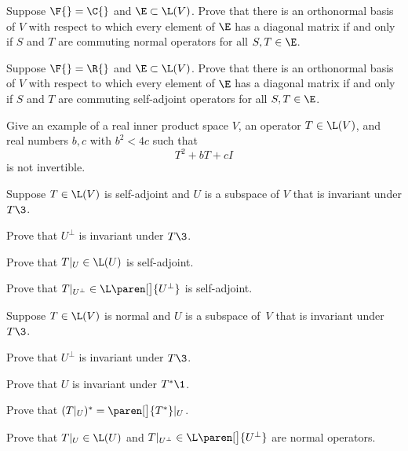 \exercise
Suppose $\F{} = \C{}$ and $\E \subset \L(V)$. Prove that there is an orthonormal basis of $V$ with respect to which every element of $\E$ has a diagonal matrix if and only if $S$ and $T$ are commuting normal operators for all $S, T \in \E$.%
 \label{5SimDiag}


\exercise
Suppose $\F{} = \R{}$ and $\E \subset \L(V)$. Prove that there is an orthonormal basis of $V$ with respect to which every element of $\E$ has a diagonal matrix if and only if $S$ and $T$ are commuting self-adjoint operators for all $S, T \in \E$.%
 \label{5SimDiagR}


\exercise
Give an example of a real inner product space $V$, an operator $T \in \L(V)$, and real numbers $b, c$ with $b^2 < 4 c$ such that
\[
T^2 + b T + c I
\]
is not invertible.


\exercise
Suppose $T \in \L(V)$ is self-adjoint and $U$ is a subspace of $V$ that is invariant under $T\3$.\label{sa210}
\begin{subtheorem}
\item
Prove that $U^\perp$ is invariant under\/ $T\3$.
\item
Prove that $T|_U \in \L(U)$ is self-adjoint.
\item
Prove that $T|_{U^\perp} \in \L\paren[\big]{U^\perp}$ is self-adjoint.
\end{subtheorem}
\exercisesubtheoremend


\exercise
Suppose $T \in \L(V)$ is normal and $U$ is a subspace of\/~$V$ that is invariant under\/~$T\3$.\label{7spectralalt}
\begin{subtheorem}
\item
Prove that $U^\perp$ is invariant under\/ $T\3$.
\item
Prove that $U$ is invariant under\/ $T^*\1$.
\item
Prove that $(T|_U)^* = \paren[\big]{T^*}|_U$.
\item
Prove that $T|_U \in \L(U)$ and $T|_{U^\perp} \in \L\paren[\big]{U^\perp}$ are normal operators.
\end{subtheorem}


